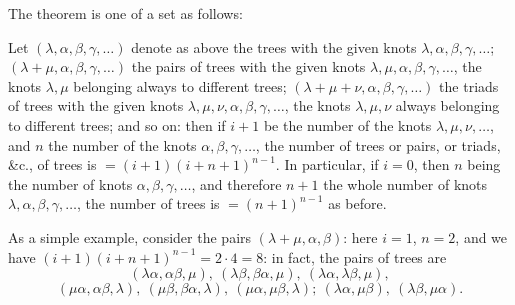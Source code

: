 \documentclass[11pt,a4paper]{article}
\begin{document}
\smallskip
The theorem is one of a set as follows:

\smallskip
Let $(\lambda, \alpha, \beta, \gamma, \ldots)$ denote as above the trees with the given knots $\lambda, \alpha, \beta, \gamma, \ldots$; $(\lambda + \mu, \alpha, \beta, \gamma, \ldots)$ the pairs of trees with the given knots $\lambda, \mu, \alpha, \beta, \gamma, \ldots$, the knots $\lambda, \mu$ belonging always to different trees; $(\lambda + \mu + \nu, \alpha, \beta, \gamma, \ldots)$ the triads of trees with the given knots $\lambda, \mu, \nu, \alpha, \beta, \gamma, \ldots$, the knots $\lambda, \mu, \nu$ always belonging to different trees; and so on: then if $i + 1$ be the number of the knots $\lambda, \mu, \nu, \ldots$, and $n$ the number of the knots $\alpha, \beta, \gamma, \ldots$, the number of trees or pairs, or triads, \&c., of trees is $= (i + 1)(i + n + 1)^{n-1}$. In particular, if $i = 0$, then $n$ being the number of knots $\alpha, \beta, \gamma, \ldots$, and therefore $n + 1$ the whole number of knots $\lambda, \alpha, \beta, \gamma, \ldots$, the number of trees is $= (n + 1)^{n-1}$ as before.

\smallskip
As a simple example, consider the pairs $(\lambda + \mu, \alpha, \beta)$: here $i = 1$, $n = 2$, and we have $(i + 1)(i + n + 1)^{n-1} = 2 \cdot 4 = 8$: in fact, the pairs of trees are
\[
(\lambda\alpha, \alpha\beta, \mu),\ (\lambda\beta, \beta\alpha, \mu),\ (\lambda\alpha, \lambda\beta, \mu),
\]
\[
(\mu\alpha, \alpha\beta, \lambda),\ (\mu\beta, \beta\alpha, \lambda),\ (\mu\alpha, \mu\beta, \lambda);\ (\lambda\alpha, \mu\beta),\ (\lambda\beta, \mu\alpha).
\]
\end{document}
